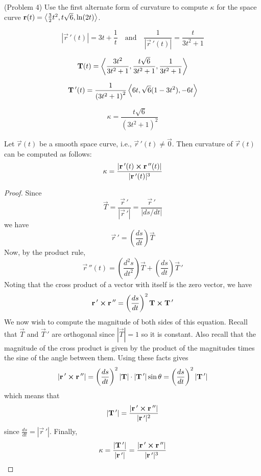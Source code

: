 \documentclass[handout]{ximera}
\begin{document}
\begin{problem}(Problem 4)
Use the first alternate form of curvature to compute $\kappa$ for the space curve $\mathbf r(t) = \left\langle \frac32 t^2, t\sqrt 6 , \ln(2t)\right\rangle$.


\begin{hint}
\[
\left|\vec r\,'(t) \right| = 3t + \frac{1}{t}  \quad \text{and} \quad \frac{1}{\left|\vec r\,'(t) \right|} = \frac{t}{3t^2 + 1}
\]
\end{hint}

\begin{hint}
\[
\mathbf T(t) = \left\langle \frac{3t^2}{3t^2 +1},\frac{t\sqrt 6}{3t^2 +1} , \frac{1}{3t^2 +1}\right\rangle
\]
\end{hint}

\begin{hint}
\[
\mathbf T\,'(t) = \frac{1}{\left(3t^2 +1\right)^2} \left\langle 6t, \sqrt 6 (1 - 3t^2), -6t\right\rangle
\]
\end{hint}

\begin{hint}
\[
\kappa = \frac{t\sqrt 6}{\left(3t^2 +1\right)^2}
\]
\end{hint}

\end{problem}


\begin{proposition}
Let $\vec r(t)$ be a smooth space curve, i.e., $\vec r\,'(t) \neq \vec 0$. Then curvature of $\vec r(t)$ can be computed as follows:
\[
\kappa = \frac{|\mathbf r\,'(t) \boldsymbol\times \mathbf r\,''(t)|}{|\mathbf r\,'(t)|^3}
\]
\end{proposition}


\begin{proof}
Since
\[
\vec T = \frac{\vec r\,'}{|\vec r\, '|} = \frac{\vec r\,'}{|ds/dt|}
\]
we have
\[
\vec r\,' = \left(\frac{ds}{dt}\right) \vec T
\]
Now, by the product rule,
\[
 \vec r\,''(t) = \left(\frac{d^2s}{dt^2}\right) \vec T + \left(\frac{ds}{dt}\right) \vec T\,'
\]
Noting that the cross product of a vector with itself is the zero vector, we have
\[
\mathbf r\,' \boldsymbol\times \mathbf r\,'' = \left(\frac{ds}{dt}\right)^2 \mathbf T \boldsymbol\times \mathbf T\,'
\]
We now wish to compute the magnitude of both sides of this equation.
Recall that $\vec T$ and $\vec T\,'$ are orthogonal since $|\vec T| = 1$ so it is constant. Also recall that the 
magnitude of the cross product is given by the product of the magnitudes times the sine of the angle between them. 
Using these facts gives
\[
|\mathbf r\,' \boldsymbol\times \mathbf r\,''| = \left(\frac{ds}{dt}\right)^2 | \mathbf T|\cdot | \mathbf T\,'|\sin \theta =\left(\frac{ds}{dt}\right)^2 | \mathbf T\,'|
\]
which means that
\[
| \mathbf T\,'| = \frac{|\mathbf r\,' \boldsymbol\times \mathbf r\,''|}{|\mathbf r\,'|^2}
\]
since $\frac{ds}{dt} = |\vec r\,'|$.
Finally,
\[
\kappa = \frac{| \mathbf T\,'|}{|\mathbf r\,'|} = \frac{|\mathbf r\,' \boldsymbol\times \mathbf r\,''|}{|\mathbf r\,'|^3}
\]
\end{proof}
\end{document}

